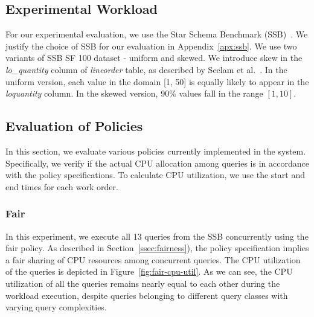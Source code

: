 
\subsection{Experimental Workload}\label{ssec:workload}
For our experimental evaluation, we use the Star Schema Benchmark (SSB)~\cite{ssb}. 
We justify the choice of SSB for our evaluation in Appendix~\ref{apx:ssb}.
We use two variants of SSB SF 100 dataset - uniform and skewed. 
We introduce skew in the \textit{lo\_quantity} column of \textit{lineorder} table, as described by Seelam et al.~\cite{DBLP:conf/wosp/2013}.
In the uniform version, each value in the domain [1, 50] is equally likely to appear in the \textit{lo\textunderscore quantity} column.
In the skewed version, 90\% values fall in the range $[1, 10]$. 

\subsection{Evaluation of Policies}\label{ssec:policy-eval}
In this section, we evaluate various policies currently implemented in the system.
Specifically, we verify if the actual CPU allocation among queries is in accordance with the policy specifications.
To calculate CPU utilization, we use the start and end times for each work order. %

\subsubsection{Fair}
In this experiment, we execute all 13 queries from the SSB concurrently using the fair policy. 
As described in Section~\ref{ssec:fairness}), the policy specification implies a fair sharing of CPU resources among concurrent queries.
The CPU utilization of the queries is depicted in Figure~\ref{fig:fair-cpu-util}.
As we can see, the CPU utilization of all the queries remains nearly equal to each other during the workload execution, despite queries belonging to different query classes with varying query complexities.

